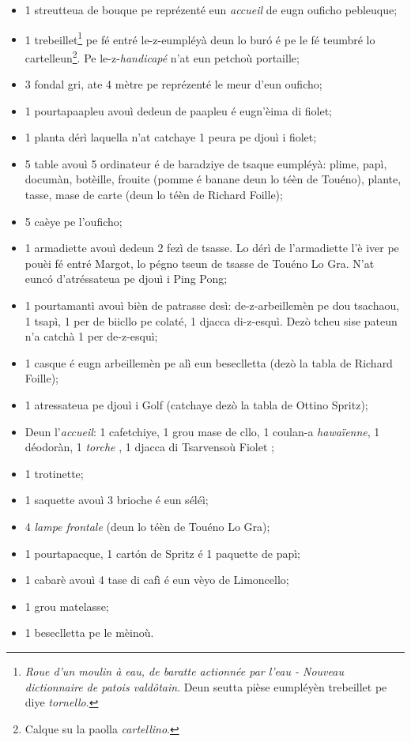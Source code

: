 \Scenographie
\begin{itemize}
\item[$\bullet$] 1 streutteua de bouque pe reprézenté eun \textit{accueil} de eugn ouficho pebleuque;
\item[$\bullet$] 1 trebeillet\footnote{ \textit{Roue d'un moulin à eau, de baratte actionnée par l'eau - Nouveau dictionnaire de patois vald\^otain}. Deun seutta pièse eumpléyèn trebeillet pe diye \textit{tornello}.} pe fé entré le-z-eumpléyà deun lo bur\'o é pe le fé teumbré lo cartelleun\footnote{ Calque su la paolla \textit{cartellino}.}. Pe le-z-\textit{handicapé} n'at eun petchoù portaille;
\item[$\bullet$] 3 fondal gri, ate 4 mètre pe reprézenté le meur d'eun ouficho;
\item[$\bullet$] 1 pourtapaapleu avouì dedeun de paapleu é eugn'èima di fiolet;
\item[$\bullet$] 1 planta dérì laquella n'at catchaye 1 peura pe djouì i fiolet;
\item[$\bullet$] 5 table avouì 5 ordinateur é de baradziye de tsaque eumpléyà: plime, papì, documàn, botèille, frouite (pomme é banane deun lo téèn de Touéno), plante, tasse, mase de carte (deun lo téèn de Richard Foille);
\item[$\bullet$] 5 caèye pe l'ouficho;
\item[$\bullet$] 1 armadiette avouì dedeun 2 fezì de tsasse. Lo dérì de l'armadiette l'è iver pe pouèi fé entré Margot, lo pégno tseun de tsasse de Touéno Lo Gra. N'at eunc\'o d'atréssateua pe djouì i Ping Pong;
\item[$\bullet$] 1 pourtamantì avouì bièn de patrasse desì: de-z-arbeillemèn pe dou tsachaou, 1 tsapì, 1 per de biicllo pe colaté, 1 djacca di-z-esquì.  Dezò tcheu sise pateun n'a catchà 1 per de-z-esquì;
\item[$\bullet$] 1 casque é eugn arbeillemèn pe alì eun beseclletta (dezò la tabla de Richard Foille);
\item[$\bullet$] 1 atressateua pe djouì i Golf (catchaye dezò la tabla de Ottino Spritz);
\item[$\bullet$] Deun l'\textit{accueil}: 1 cafetchiye, 1 grou mase de cllo, 1 coulan-a \textit{hawaïenne}, 1 déodoràn, 1 \textit{torche} \torcia, 1 djacca di Tsarvensoù Fiolet ;
\item[$\bullet$] 1 trotinette;
\item[$\bullet$] 1 saquette avouì 3 brioche é eun séléì;
\item[$\bullet$] 4 \textit{lampe frontale} (deun lo téèn de Touéno Lo Gra);
\item[$\bullet$] 1 pourtapacque, 1 cart\'on de Spritz é 1 paquette de papì;
\item[$\bullet$] 1 cabarè avouì 4 tase di cafì é eun vèyo de Limoncello;
\item[$\bullet$] 1 grou matelasse;
\item[$\bullet$] 1 beseclletta pe le mèinoù.
\end{itemize}

